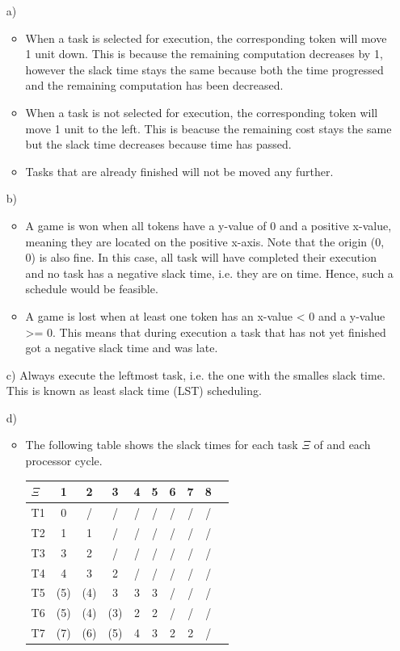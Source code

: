 \documentclass[12pt]{article}
\begin{document}
\begin{itemize}
\item[a)] 
	\begin{itemize}
	\item When a task is selected for execution, the corresponding token will move 1 unit down. This is because the remaining computation decreases by 1, however the slack time stays the same because both the time progressed and the remaining computation has been decreased. 
	\item When a task is not selected for execution, the corresponding token will move 1 unit to the left. This is beacuse the remaining cost stays the same but the slack time decreases because time has passed.
	\item Tasks that are already finished will not be moved any further.
	\end{itemize}
	
\item[b)] 
	\begin{itemize}
	\item A game is won when all tokens have a y-value of 0 and a positive x-value, meaning they are located on the positive x-axis. Note that the origin (0, 0) is also fine. In this case, all task will have completed their execution and no task has a negative slack time, i.e. they are on time. Hence, such a schedule would be feasible.
	\item A game is lost when at least one token has an x-value < 0 and a y-value >= 0. This means that during execution a task that has not yet finished got a negative slack time and was late. 
	\end{itemize}
	
\item[c)] Always execute the leftmost task, i.e. the one with the smalles slack time.  This is known as least slack time (LST) scheduling.

\item[d)] \begin{itemize}
	\item The following table shows the slack times for each task $\Xi$ of  and each processor cycle.
	
	\begin{tabular}{ l | c | c | c | c | c | c | c | c | c}
  		\hline			
  		$\Xi$ & 1 & 2 & 3 & 4 & 5 & 6 & 7 & 8 \\
  		\hline
  		T1 & 0 	& / 	& / 	& / 	& / 	& / & / & / \\
  		T2 & 1 	& 1 	& / 	& / 	& / 	& / & / & / \\
  		T3 & 3 	& 2 	& / 	& / 	& / 	& / & / & / \\
  		T4 & 4 	& 3 	& 2 	& / 	& / 	& / & / & / \\
  		T5 & (5) 	& (4) 	& 3 	& 3 	& 3 	& / & / & / \\
  		T6 & (5) 	& (4) 	& (3) 	& 2 	& 2 	& / & / & / \\
  		T7 & (7) 	& (6) 	& (5) 	& 4 	& 3 	& 2 & 2 & / \\
  		\hline  
	\end{tabular}
	

\end{itemize}
\end{itemize}
\end{document}
